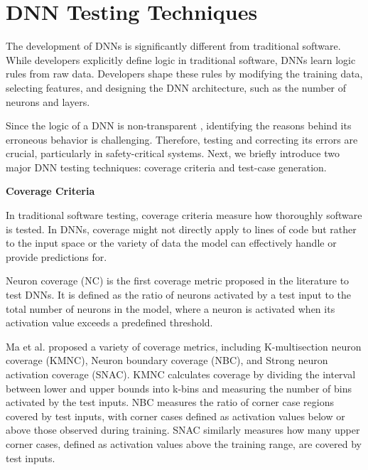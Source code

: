 




\section{DNN Testing Techniques}

The development of DNNs is significantly different from traditional software. While developers explicitly define logic in traditional software, DNNs learn logic rules from raw data. Developers shape these rules by modifying the training data, selecting features, and designing the DNN architecture, such as the number of neurons and layers.

Since the logic of a DNN is non-transparent \cite{deepxplore}, identifying the reasons behind its erroneous behavior is challenging. Therefore, testing and correcting its errors are crucial, particularly in safety-critical systems. Next, we briefly introduce two major DNN testing techniques: coverage criteria and test-case generation.

\smallskip\noindent%
\textbf{Coverage Criteria}

In traditional software testing, coverage criteria measure how thoroughly software is tested. In DNNs, coverage might not directly apply to lines of code but rather to the input space or the variety of data the model can effectively handle or provide predictions for.

Neuron coverage (NC) \cite{deepxplore} is the first coverage metric proposed in the literature to test DNNs. It is defined as the ratio of neurons activated by a test input to the total number of neurons in the model, where a neuron is activated when its activation value exceeds a predefined threshold.

Ma et al. \cite{deepguage} proposed a variety of coverage metrics, including K-multisection neuron coverage (KMNC), Neuron boundary coverage (NBC), and Strong neuron activation coverage (SNAC). KMNC calculates coverage by dividing the interval between lower and upper bounds into k-bins and measuring the number of bins activated by the test inputs. NBC measures the ratio of corner case regions covered by test inputs, with corner cases defined as activation values below or above those observed during training. SNAC similarly measures how many upper corner cases, defined as activation values above the training range, are covered by test inputs.

